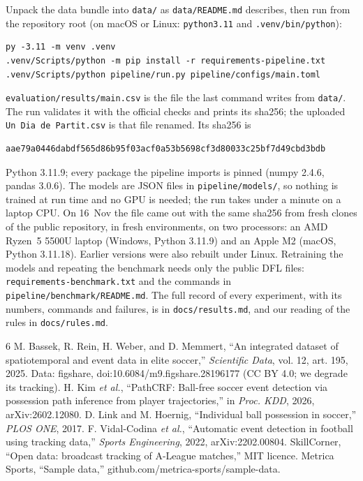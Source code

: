 \documentclass[conference,a4paper]{IEEEtran}
\newcommand{\code}[1]{\texttt{#1}}
\begin{document}
Unpack the data bundle into \code{data/} as \code{data/README.md} describes, then run from the repository root
(on macOS or Linux: \code{python3.11} and \code{.venv/bin/python}):

{\scriptsize
\begin{verbatim}
py -3.11 -m venv .venv
.venv/Scripts/python -m pip install -r requirements-pipeline.txt
.venv/Scripts/python pipeline/run.py pipeline/configs/main.toml
\end{verbatim}
}

\code{evaluation/results/main.csv} is the file the last command writes from \code{data/}. The run validates it
with the official checks and prints its sha256; the uploaded \code{Un Dia de Partit.csv} is that file renamed. Its sha256 is

{\scriptsize
\begin{verbatim}
aae79a0446dabdf565d86b95f03acf0a53b5698cf3d80033c25bf7d49cbd3bdb
\end{verbatim}
}

Python 3.11.9; every package the pipeline imports is pinned (numpy 2.4.6, pandas 3.0.6). The models are JSON files
in \code{pipeline/models/}, so nothing is trained at run time and no GPU is needed; the run takes under a minute
on a laptop CPU. On 16~Nov the file came out with the same sha256 from fresh clones of the public repository, in
fresh environments, on two processors: an AMD Ryzen~5 5500U laptop (Windows, Python 3.11.9) and an Apple M2
(macOS, Python 3.11.18). Earlier versions were also rebuilt under Linux. Retraining the models and repeating the benchmark needs only the public DFL files:
\code{requirements-benchmark.txt} and the commands in \code{pipeline/benchmark/README.md}. The full record of
every experiment, with its numbers, commands and failures, is in \code{docs/results.md}, and our reading of the
rules in \code{docs/rules.md}.

\begin{thebibliography}{6}
 M. Bassek, R. Rein, H. Weber, and D. Memmert, ``An integrated dataset of spatiotemporal and
  event data in elite soccer,'' \emph{Scientific Data}, vol. 12, art. 195, 2025. Data: figshare,
  doi:10.6084/m9.figshare.28196177 (CC BY 4.0; we degrade its tracking).
 H. Kim \emph{et al.}, ``PathCRF: Ball-free soccer event detection via possession path inference
  from player trajectories,'' in \emph{Proc. KDD}, 2026, arXiv:2602.12080.
 D. Link and M. Hoernig, ``Individual ball possession in soccer,'' \emph{PLOS ONE}, 2017.
 F. Vidal-Codina \emph{et al.}, ``Automatic event detection in football using tracking data,''
  \emph{Sports Engineering}, 2022, arXiv:2202.00804.
 SkillCorner, ``Open data: broadcast tracking of A-League matches,'' MIT licence.
 Metrica Sports, ``Sample data,'' github.com/metrica-sports/sample-data.
\end{thebibliography}
\end{document}
